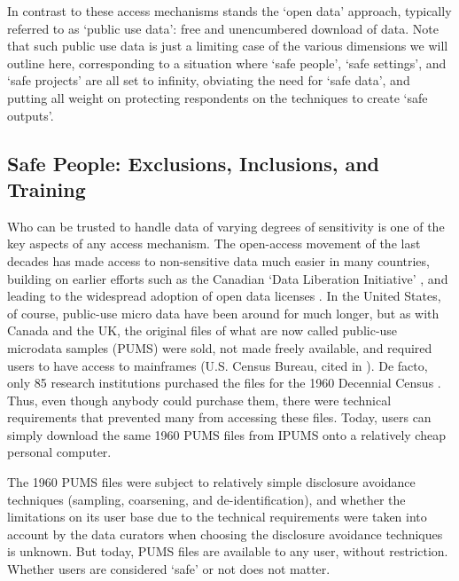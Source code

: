 In contrast to these access mechanisms stands the `open data' approach, typically referred to as `public use data': free and unencumbered download of data. Note that such public use data is just a limiting case of the various dimensions we will outline here, corresponding to a situation where `safe people', `safe settings', and `safe projects' are all set to infinity, obviating the need for `safe data', and putting all weight on protecting respondents on the techniques to create `safe outputs'. 

\subsection{Safe People: Exclusions, Inclusions, and Training}

Who can be trusted to handle data of varying degrees of sensitivity is one of the key aspects of any access mechanism. The open-access movement of the last decades has made access to non-sensitive data much easier in many countries, building on earlier efforts such as the Canadian `Data Liberation Initiative' \cite{currie2015social}, and leading to the widespread adoption of open data licenses \cite{statistics_canada_statistics_2012,uk_government_open_2014}. In the United States, of course, public-use micro data have been around for much longer, but as with Canada and the UK, the original files of what are now called public-use microdata samples (PUMS) were sold, not made freely available, and required users to have access to mainframes (U.S. Census Bureau, cited in \cite{anderson_american_2015}). De facto, only 85 research institutions purchased the files for the 1960 Decennial Census \cite{anderson_american_2015}. Thus, even though anybody could purchase them, there were technical requirements that prevented many from accessing these files. Today,  users can simply download the same 1960 PUMS files from IPUMS \cite{ruggles_steven_ipums_2021} onto a relatively cheap personal computer.

The 1960 PUMS files were subject to relatively simple disclosure avoidance techniques (sampling, coarsening, and de-identification), and whether the limitations on its user base due to the technical requirements were taken into account by the data curators when choosing the disclosure avoidance techniques is unknown. But today, PUMS files are available to any user, without restriction. Whether users are considered `safe' or not does not matter. 

